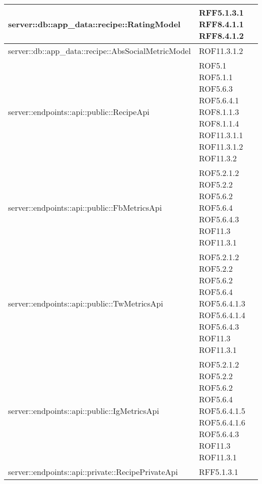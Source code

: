 \begin{center}
\begin{longtable}{| p{11cm} | p{2.5cm} |}
\hline
server::db::app\_data::recipe::RatingModel & RFF5.1.3.1 \newline RFF8.4.1.1 \newline RFF8.4.1.2 \\
\hline
server::db::app\_data::recipe::AbsSocialMetricModel & ROF11.3.1.2 \\
\hline
server::endpoints::api::public::RecipeApi & ROF5.1 \newline ROF5.1.1 \newline ROF5.6.3 \newline ROF5.6.4.1 \newline ROF8.1.1.3 \newline ROF8.1.1.4 \newline ROF11.3.1.1 \newline ROF11.3.1.2 \newline ROF11.3.2 \\
\hline
server::endpoints::api::public::FbMetricsApi & ROF5.2.1.2 \newline ROF5.2.2 \newline ROF5.6.2 \newline ROF5.6.4 \newline ROF5.6.4.3 \newline ROF11.3 \newline ROF11.3.1 \\
\hline
server::endpoints::api::public::TwMetricsApi & ROF5.2.1.2 \newline ROF5.2.2 \newline ROF5.6.2 \newline ROF5.6.4 \newline ROF5.6.4.1.3 \newline ROF5.6.4.1.4 \newline ROF5.6.4.3 \newline ROF11.3 \newline ROF11.3.1 \\
\hline
server::endpoints::api::public::IgMetricsApi & ROF5.2.1.2 \newline ROF5.2.2 \newline ROF5.6.2 \newline ROF5.6.4 \newline ROF5.6.4.1.5 \newline ROF5.6.4.1.6 \newline ROF5.6.4.3 \newline ROF11.3 \newline ROF11.3.1 \\
\hline
server::endpoints::api::private::RecipePrivateApi & RFF5.1.3.1 \\

\end{longtable}
\end{center}
